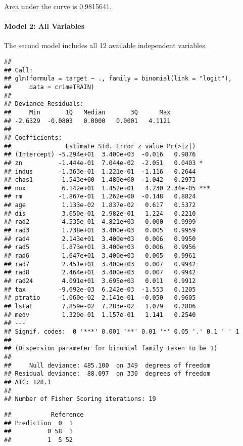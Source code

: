 \documentclass[]{article}
\let\oldparagraph\paragraph
\renewcommand{\paragraph}[1]{\oldparagraph{#1}\mbox{}}
\begin{document}
Area under the curve is 0.9815641.

\hypertarget{model-2-all-variables}{%
\paragraph{Model 2: All Variables}\label{model-2-all-variables}}

The second model includes all 12 available independent variables.

\begin{verbatim}
## 
## Call:
## glm(formula = target ~ ., family = binomial(link = "logit"), 
##     data = crimeTRAIN)
## 
## Deviance Residuals: 
##     Min       1Q   Median       3Q      Max  
## -2.6329  -0.0803   0.0000   0.0001   4.1121  
## 
## Coefficients:
##               Estimate Std. Error z value Pr(>|z|)    
## (Intercept) -5.294e+01  3.400e+03  -0.016   0.9876    
## zn          -1.444e-01  7.044e-02  -2.051   0.0403 *  
## indus       -1.363e-01  1.221e-01  -1.116   0.2644    
## chas1       -1.543e+00  1.480e+00  -1.042   0.2973    
## nox          6.142e+01  1.452e+01   4.230 2.34e-05 ***
## rm          -1.867e-01  1.262e+00  -0.148   0.8824    
## age          1.133e-02  1.837e-02   0.617   0.5372    
## dis          3.650e-01  2.982e-01   1.224   0.2210    
## rad2        -4.535e-01  4.821e+03   0.000   0.9999    
## rad3         1.738e+01  3.400e+03   0.005   0.9959    
## rad4         2.143e+01  3.400e+03   0.006   0.9950    
## rad5         1.873e+01  3.400e+03   0.006   0.9956    
## rad6         1.647e+01  3.400e+03   0.005   0.9961    
## rad7         2.451e+01  3.400e+03   0.007   0.9942    
## rad8         2.464e+01  3.400e+03   0.007   0.9942    
## rad24        4.091e+01  3.695e+03   0.011   0.9912    
## tax         -9.692e-03  6.242e-03  -1.553   0.1205    
## ptratio     -1.060e-02  2.141e-01  -0.050   0.9605    
## lstat        7.859e-02  7.283e-02   1.079   0.2806    
## medv         1.320e-01  1.157e-01   1.141   0.2540    
## ---
## Signif. codes:  0 '***' 0.001 '**' 0.01 '*' 0.05 '.' 0.1 ' ' 1
## 
## (Dispersion parameter for binomial family taken to be 1)
## 
##     Null deviance: 485.100  on 349  degrees of freedom
## Residual deviance:  88.097  on 330  degrees of freedom
## AIC: 128.1
## 
## Number of Fisher Scoring iterations: 19
\end{verbatim}

\begin{verbatim}
##           Reference
## Prediction  0  1
##          0 58  1
##          1  5 52
\end{verbatim}
\end{document}
